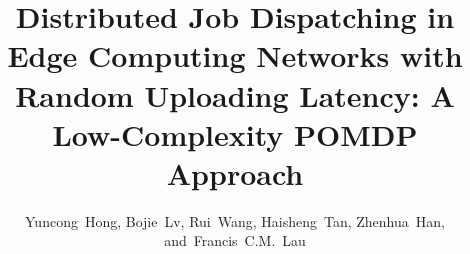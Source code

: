 \documentclass[10pt,journal,compsoc]{IEEEtran} %
\theoremstyle{definition}             %
\theoremstyle{remark}                 %
\theoremstyle{plain}                  %
\begin{document}
    \title{Distributed Job Dispatching in Edge Computing Networks with Random Uploading Latency: A Low-Complexity POMDP Approach
    }

    \author{
        Yuncong~Hong,%
        Bojie~Lv,%
        Rui~Wang,%
        Haisheng~Tan,%
        Zhenhua~Han,%
        and~Francis~C.M.~Lau%
    }%


    
    \maketitle
    
    

    
    

    
    
    

    

    \ifCLASSOPTIONcaptionsoff
        \newpage
    \fi

    
    

    
\end{document}
